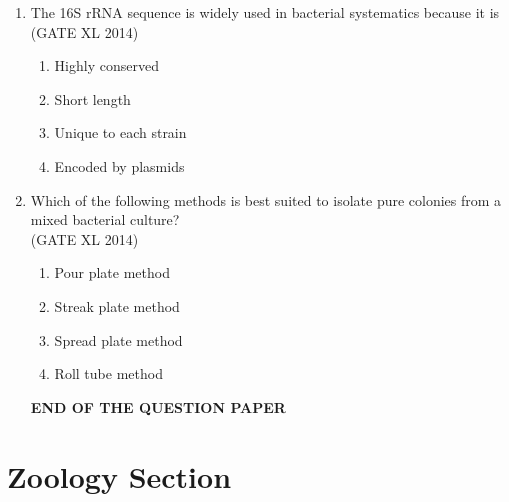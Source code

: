 \documentclass[journal,12pt,onecolumn]{IEEEtran}
\theoremstyle{remark}
\begin{document}
\begin{enumerate}
    \item The 16S rRNA sequence is widely used in bacterial systematics because it is
    \hfill (GATE XL 2014) 
    \begin{multicols}{2}
    \begin{enumerate}
        \item Highly conserved  
        \item Short length  
        \item Unique to each strain  
        \item Encoded by plasmids  
    \end{enumerate}
    \end{multicols}


    \item Which of the following methods is best suited to isolate pure colonies from a mixed bacterial culture?  \\
    \hfill (GATE XL 2014)
    \begin{multicols}{2}
    \begin{enumerate}
        \item Pour plate method  
        \item Streak plate method  
        \item Spread plate method  
        \item Roll tube method  
    \end{enumerate}
    \end{multicols}
 \begin{center}
     \textbf{END OF THE QUESTION PAPER}
 \end{center}

\end{enumerate}
\newpage
\section*{Zoology Section}
\end{document}
